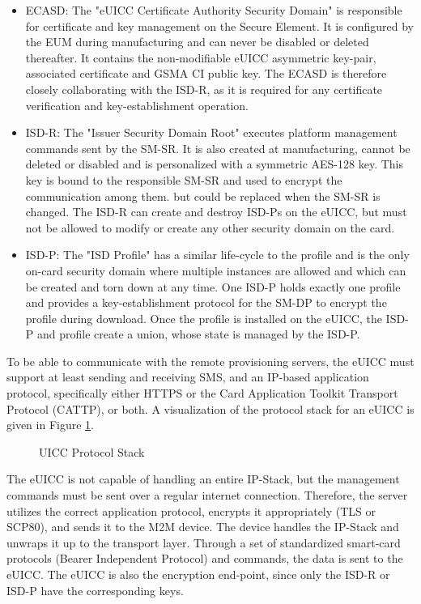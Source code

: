 \begin{itemize}
        \item ECASD: The "eUICC Certificate Authority Security Domain" is responsible for certificate and key management on the Secure Element. It is configured by the EUM during manufacturing and can never be disabled or deleted thereafter. It contains the non-modifiable eUICC asymmetric key-pair, associated certificate and GSMA CI public key. The ECASD is therefore closely collaborating with the ISD-R, as it is required for any certificate verification and key-establishment operation.
        \item ISD-R: The "Issuer Security Domain Root" executes platform management commands sent by the SM-SR. It is also created at manufacturing, cannot be deleted or disabled and is personalized with a symmetric AES-128 key. This key is bound to the responsible SM-SR and used to encrypt the communication among them. but could be replaced when the SM-SR is changed. The ISD-R can create and destroy ISD-Ps on the eUICC, but must not be allowed to modify or create any other security domain on the card.
        \item ISD-P: The "ISD Profile" has a similar life-cycle to the profile and is the only on-card security domain where multiple instances are allowed and which can be created and torn down at any time. One ISD-P holds exactly one profile and provides a key-establishment protocol for the SM-DP to encrypt the profile during download. Once the profile is installed on the eUICC, the ISD-P and profile create a union, whose state is managed by the ISD-P.
\end{itemize}

To be able to communicate with the remote provisioning servers, the eUICC must support at least sending and receiving SMS, and an IP-based application protocol, specifically either HTTPS or the Card Application Toolkit Transport Protocol (\acrshort{CATTP}), or both. A visualization of the protocol stack for an eUICC is given in Figure \ref{fig:prot_stack}.
\begin{figure}[ht]
    \centering
    \fontsize{7.7}{9.3}\selectfont
    
    \caption{UICC Protocol Stack}
    \label{fig:prot_stack}
\end{figure}
The eUICC is not capable of handling an entire IP-Stack, but the management commands must be sent over a regular internet connection. Therefore, the server utilizes the correct application protocol, encrypts it appropriately (TLS or SCP80), and sends it to the M2M device. The device handles the IP-Stack and unwraps it up to the transport layer. Through a set of standardized smart-card protocols (Bearer Independent Protocol) and commands, the data is sent to the eUICC. The eUICC is also the encryption end-point, since only the ISD-R or ISD-P have the corresponding keys. 


